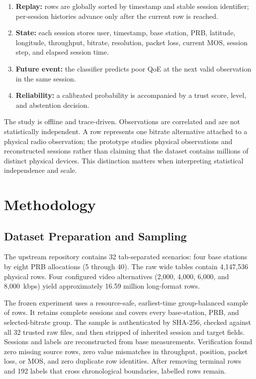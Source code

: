 \documentclass[10pt,conference]{IEEEtran}
\begin{document}
\begin{enumerate}
\item \textbf{Replay:} rows are globally sorted by timestamp and stable
      session identifier; per-session histories advance only after the
      current row is reached.
\item \textbf{State:} each session stores user, timestamp, base station, PRB,
      latitude, longitude, throughput, bitrate, resolution, packet loss,
      current MOS, session step, and elapsed session time.
\item \textbf{Future event:} the classifier predicts poor QoE at the next
      valid observation in the same session.
\item \textbf{Reliability:} a calibrated probability is accompanied by a
      trust score, level, and abstention decision.
\end{enumerate}

The study is offline and trace-driven.  Observations are correlated and are
not statistically independent.  A row represents one bitrate
alternative attached to a physical radio observation; the prototype studies
\PhysicalObservations physical observations and \SampleSessions reconstructed
sessions rather than claiming that the dataset contains millions of distinct
physical devices.  This distinction matters when interpreting statistical
independence and scale.

\section{Methodology}

\subsection{Dataset Preparation and Sampling}

The upstream repository contains 32 tab-separated scenarios: four base
stations by eight PRB allocations (5 through 40).  The raw wide tables contain
4,147,536 physical rows.  Four configured video alternatives (2,000, 4,000,
6,000, and 8,000~kbps) yield approximately 16.59 million long-format rows.

The frozen experiment uses a resource-safe, earliest-time group-balanced
sample of \SampleRows rows.  It retains complete sessions and covers every
base-station, PRB, and selected-bitrate group.  The sample is authenticated by
SHA-256, checked against all 32 trusted raw files, and then stripped of
inherited session and target fields.  Sessions and labels are reconstructed
from base measurements.  Verification found zero missing source rows, zero value
mismatches in throughput, position, packet loss, or MOS, and zero duplicate row
identities.  After removing \SampleSessions terminal rows and 192 labels that
cross chronological boundaries, \FinalRows labelled rows remain.
\end{document}
